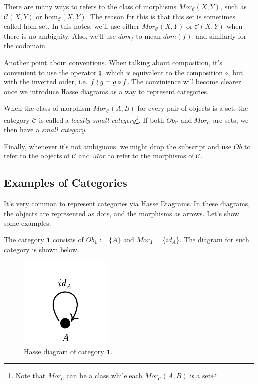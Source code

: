 There are many ways to refers to the class of morphisms $Mor_\mathcal C (X,Y)$, such as
$\mathcal C(X,Y)$ or $\text{hom}_\mathcal C (X,Y)$. The reason for this is that
this set is sometimes called hom-set. In this notes, we'll use either $Mor_\mathcal C (X,Y)$
or $\mathcal C (X,Y)$ when there is no ambiguity. Also, we'll use $dom_f$ to mean $dom(f)$,
and similarly for the codomain.

Another point about conventions. When talking about composition, it's convenient
to use the operator $\fatsemi$, which is equivalent to the composition $\circ$,
but with the inverted order, i.e. $f \fatsemi g = g \circ f$. The convinience
will become clearer once we introduce Hasse diagrams as a way to represent categories.

When the class of morphism $Mor_\mathcal C(A,B)$ for every pair of objects is a set,
the category $\mathcal C$ is called a \textit{locally small category}\footnote{Note
	that $Mor_\mathcal C$ can be a class while each $Mor_\mathcal C(A,B)$ is a set}.
If both $Ob_\mathcal C$ and $Mor_\mathcal C$ are sets, we then have a \textit{small category}.

Finally, whenever it's not ambiguous, we might drop the subscript and use $Ob$
to refer to the objects of $\mathcal C$ and $Mor$ to refer to the morphisms of $\mathcal C$.

\subsection{Examples of Categories}

It's very common to represent categories via Hasse Diagrams. In these diagrams, the
objects are represented as dots, and the morphisms as arrows. Let's show some examples.

\begin{example}[Category $\bm 1$]
	The category $\bm 1$ consists of $Ob_{\bm 1} := \{A\}$ and $Mor_{\bm 1} = \{id_A\}$.
	The diagram for such category is shown below.
	\begin{figure}[H]
		\begin{center}
			\includegraphics{./notebooks/1Cat}
		\end{center}
		\caption{Hasse diagram of category $\bm 1$.}
		\label{fig:1Cat}
	\end{figure}
\end{example}

